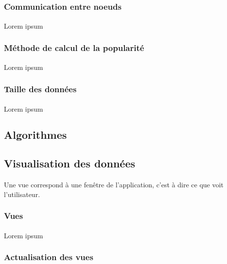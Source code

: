 \documentclass[12pt]{article}
\begin{document}
\subsubsection{Communication entre noeuds}
\paragraph{} Lorem ipsum

\subsubsection{Méthode de calcul de la popularité}
\paragraph{} Lorem ipsum

\subsubsection{Taille des données}
\paragraph{}Lorem ipsum

\subsection{Algorithmes}


\subsection{Visualisation des données}
\paragraph{} Une vue correspond à une fenêtre de l'application, c'est à dire ce que voit l'utilisateur.

\subsubsection{Vues}
\paragraph{} Lorem ipsum

\subsubsection{Actualisation des vues}
\end{document}
